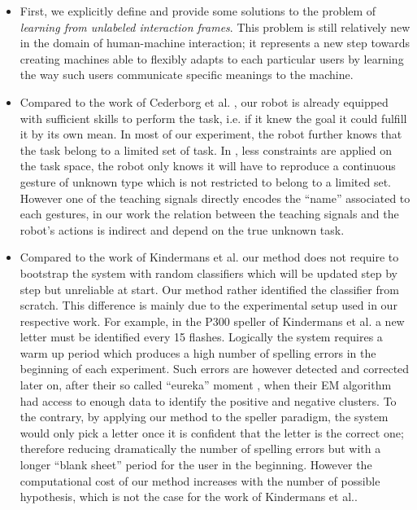\begin{itemize}

\item First, we explicitly define and provide some solutions to the problem of \emph{learning from unlabeled interaction frames}. This problem is still relatively new in the domain of human-machine interaction; it represents a new step towards creating machines able to flexibly adapts to each particular users by learning the way such users communicate specific meanings to the machine.

\item Compared to the work of Cederborg et al. \cite{cederborg2011imitating}, our robot is already equipped with sufficient skills to perform the task, i.e. if it knew the goal it could fulfill it by its own mean. In most of our experiment, the robot further knows that the task belong to a limited set of task. In \cite{cederborg2011imitating}, less constraints are applied on the task space, the robot only knows it will have to reproduce a continuous gesture of unknown type which is not restricted to belong to a limited set. However one of the teaching signals directly encodes the ``name'' associated to each gestures, in our work the relation between the teaching signals and the robot's actions is indirect and depend on the true unknown task.

\item Compared to the work of Kindermans et al. \cite{Kindermans2012a,kindermans2014integrating} our method does not require to bootstrap the system with random classifiers which will be updated step by step but unreliable at start. Our method rather identified the classifier from scratch. This difference is mainly due to the experimental setup used in our respective work. For example, in the P300 speller of Kindermans et al. a new letter must be identified every 15 flashes. Logically the system requires a warm up period which produces a high number of spelling errors in the beginning of each experiment. Such errors are however detected and corrected later on, after their so called ``eureka'' moment \cite{Kindermans2012a}, when their EM algorithm had access to enough data to identify the positive and negative clusters. To the contrary, by applying our method to the speller paradigm, the system would only pick a letter once it is confident that the letter is the correct one; therefore reducing dramatically the number of spelling errors but with a longer ``blank sheet'' period for the user in the beginning. However the computational cost of our method increases with the number of possible hypothesis, which is not the case for the work of Kindermans et al..


\end{itemize}
